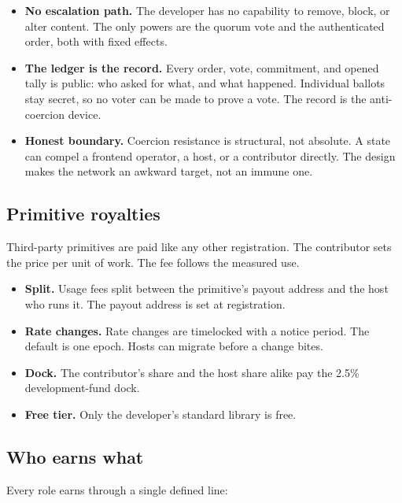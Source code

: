 \documentclass[11pt]{article}
\begin{document}
\begin{itemize}
          a registered governance choice, not a developer one.
    \item \textbf{No escalation path.} The developer has no
          capability to remove, block, or alter content. The only powers
          are the quorum vote and the authenticated order, both with
          fixed effects.
    \item \textbf{The ledger is the record.} Every order, vote,
          commitment, and opened tally is public: who asked for what, and
          what happened. Individual ballots stay secret, so no voter can
          be made to prove a vote. The record is the anti-coercion
          device.
    \item \textbf{Honest boundary.} Coercion resistance is
          structural, not absolute. A state can compel a frontend
          operator, a host, or a contributor directly. The design makes
          the network an awkward target, not an immune one.
\end{itemize}

\subsection{Primitive royalties}

Third-party primitives are paid like any other registration. The
contributor sets the price per unit of work. The fee follows the
measured use.
\begin{itemize}
    \item \textbf{Split.} Usage fees split between the primitive's
          payout address and the host who runs it. The payout address is
          set at registration.
    \item \textbf{Rate changes.} Rate changes are timelocked with a
          notice period. The default is one epoch. Hosts can migrate before
          a change bites.
    \item \textbf{Dock.} The contributor's share and the host share
          alike pay the 2.5\% development-fund dock.
    \item \textbf{Free tier.} Only the developer's standard library is
          free.
\end{itemize}

\subsection{Who earns what}

Every role earns through a single defined line:
\end{document}
